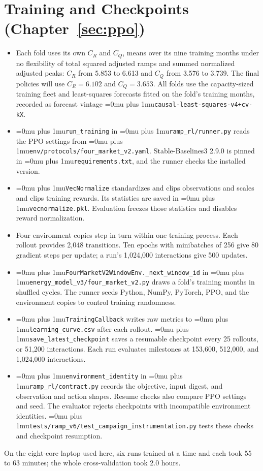 \documentclass{UNCC-thesis}
\newcommand{\codepath}[1]{{\Urlmuskip=0mu plus 1mu\relax\nolinkurl{#1}}}
\begin{document}
\section{Training and Checkpoints (Chapter~\ref{sec:ppo})}
\begin{itemize}
  \item Each fold uses its own \(C_R\) and \(C_Q\), means over its nine
        training months under no flexibility of total squared adjusted ramps
        and summed normalized adjusted peaks: \(C_R\) from 5.853 to 6.613 and
        \(C_Q\) from 3.576 to 3.739. The final policies will use
        \(C_R=6.102\) and \(C_Q=3.653\). All folds use the capacity-sized
        training fleet and least-squares forecasts fitted on the fold's
        training months, recorded as forecast vintage
        \codepath{causal-least-squares-v4+cv-kX}.
  \item \codepath{run_training} in \codepath{ramp_rl/runner.py} reads the
        PPO settings from \codepath{env/protocols/four_market_v2.yaml}.
        Stable-Baselines3 2.9.0 is pinned in \codepath{requirements.txt},
        and the runner checks the installed version.
  \item \codepath{VecNormalize} standardizes and clips observations and
        scales and clips training rewards. Its statistics are saved in
        \codepath{vecnormalize.pkl}. Evaluation freezes those statistics
        and disables reward normalization.
  \item Four environment copies step in turn within one training process.
        Each rollout provides 2,048 transitions. Ten epochs with minibatches
        of 256 give 80 gradient steps per update; a run's 1,024,000
        interactions give 500 updates.
  \item \codepath{FourMarketV2WindowEnv._next_window_id} in
        \codepath{energy_model_v3/four_market_v2.py} draws a fold's training
        months in shuffled cycles. The runner seeds Python, NumPy, PyTorch,
        PPO, and the environment copies to control training randomness.
  \item \codepath{TrainingCallback} writes raw metrics to
        \codepath{learning_curve.csv} after each rollout.
        \codepath{save_latest_checkpoint} saves a resumable checkpoint every
        25 rollouts, or 51,200 interactions. Each run evaluates milestones
        at 153,600, 512,000, and 1,024,000 interactions.
  \item \codepath{environment_identity} in \codepath{ramp_rl/contract.py}
        records the objective, input digest, and observation and action
        shapes. Resume checks also compare PPO settings and seed. The
        evaluator rejects checkpoints with incompatible environment
        identities. \codepath{tests/ramp_v6/test_campaign_instrumentation.py}
        tests these checks and checkpoint resumption.
\end{itemize}
On the eight-core laptop used here, six runs trained at a time and each took
55 to 63 minutes; the whole cross-validation took 2.0 hours.
\end{document}
